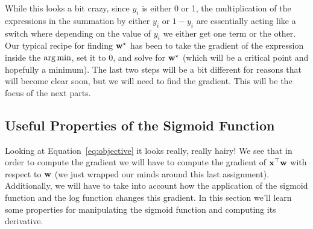 \documentclass[assignment03_Solutions]{subfiles}
\begin{document}
While this looks a bit crazy, since $y_i$ is either 0 or 1, the multiplication of the expressions in the summation by either $y_i$ or $1-y_i$ are essentially acting like a switch where depending on the value of $y_i$ we either get one term or the other.  Our typical recipe for finding $\mathbf{w}^\star$ has been to take the gradient of the expression inside the $\operatorname*{arg\,min}$, set it to $0$, and solve for $\mathbf{w}^\star$ (which will be a critical point and hopefully a minimum).  The last two steps will be a bit different for reasons that will become clear soon, but we will need to find the gradient.  This will be the focus of the next parts.

\subsection{Useful Properties of the Sigmoid Function}

Looking at Equation~\ref{eq:objective} it looks really, really hairy!  We see that in order to compute the gradient we will have to compute the gradient of $\mathbf{x}^\top \mathbf{w}$ with respect to $\mathbf{w}$ (we just wrapped our minds around this last assignment).  Additionally, we will have to take into account how the application of the sigmoid function and the log function changes this gradient.  In this section we'll learn some properties for manipulating the sigmoid function and computing its derivative.
\end{document}
